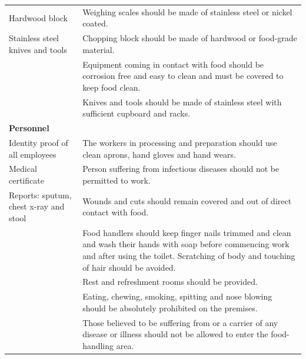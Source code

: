 \documentclass[a4paper, 12pt, twoside]{article}
\newcommand\tabitem{\makebox[1em][r]{\textbullet~}}
\begin{document}
\begin{longtable}[l]{>{\raggedright}p{6.5cm}>{\raggedright\arraybackslash}p{8.5cm}}
	\newline{} \newline{} \tabitem Hardwood block	&	\newline{} \tabitem Weighing scales should be made of stainless steel or nickel coated.\\
	\newline{} \tabitem Stainless steel knives and tools 	&	\newline{} \tabitem Chopping block should be made of hardwood or food-grade material.\\
	&	\newline{} \tabitem Equipment coming in contact with food should be corrosion free and easy to clean and must be covered to keep food clean.\\
		& 	\newline{}\tabitem Knives and tools should be made of stainless steel with sufficient cupboard and racks. \\
    \midrule
   \textbf{Personnel}	&	\\
    \midrule
    \tabitem Identity proof of all employees	&	 The workers in processing and preparation should use clean aprons, hand gloves and hand wears.\\
\newline{} \tabitem Medical certificate	&	 \newline{}\tabitem Person suffering from infectious diseases should not be permitted to work.\\
\newline{}\tabitem Reports: sputum, chest x-ray and stool	&	\newline{}\tabitem Wounds and cuts should remain covered and out of direct contact with food.\\
	&	\newline{}\tabitem Food handlers should keep finger nails trimmed and clean and wash their hands with soap before commencing work and after using the toilet. Scratching of body and touching of hair should be avoided.\\
	&	\newline{}\tabitem Rest and refreshment rooms should be provided.\\
	&	\newline{}\tabitem Eating, chewing, smoking, spitting and nose blowing should be absolutely prohibited on the premises.\\
	&	\newline{}\tabitem Those believed to be suffering from or a carrier of any disease or illness should not be allowed to enter the food-handling area.\\

\end{longtable}
\end{document}
